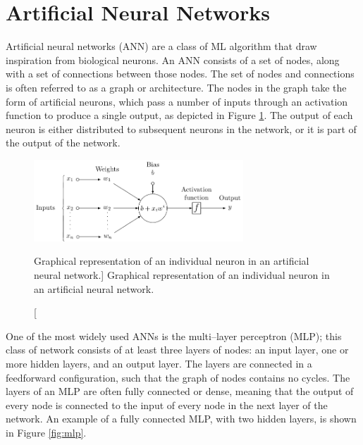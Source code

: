 \section{Artificial Neural Networks}
Artificial neural networks (ANN) are a class of ML algorithm that draw
inspiration from biological neurons. An ANN consists of a set of nodes, along
with a set of connections between those nodes. The set of nodes and connections
is often referred to as a graph or architecture. The nodes in 
the graph take the form of artificial neurons, which pass a number of inputs 
through an activation function to produce a single output, as depicted in 
Figure \ref{fig:neuron}.  The output of each neuron is either distributed to 
subsequent neurons in the network, or it is part of the output of the network. 
\begin{figure}

	\centering

	\includegraphics[width = 0.7\textwidth]{figures/neuron.pdf}

	\caption
	[Graphical representation of an individual neuron in an artificial neural
	network.]
	{Graphical representation of an individual neuron in an artificial neural
	network.}

	\label{fig:neuron}

\end{figure}

One of the most widely used ANNs is the multi--layer perceptron 
(MLP)\cite{Reed1999}; this class of network consists of at least three layers 
of nodes: an input layer, one or more hidden layers, and an output layer. The 
layers are connected in a feedforward configuration, such that the graph of 
nodes contains no cycles. The layers of an MLP are often fully connected or 
dense, meaning that the output of every node is connected to the input of 
every node in the next layer of the network. An example of a fully connected 
MLP, with two hidden layers, is shown in Figure \ref{fig:mlp}. 

